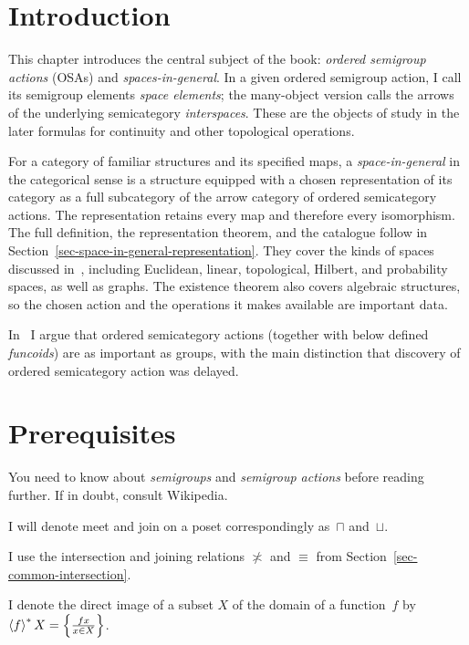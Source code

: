 \providecommand{\osaprereqref}[1]{\ref{#1}}

\chapter{Introduction}

This chapter introduces the central subject of the book: \emph{ordered
semigroup actions} (OSAs) and \emph{spaces-in-general}.  In a given ordered
semigroup action, I call its semigroup elements \emph{space elements};
the many-object version calls the arrows of the underlying semicategory
\emph{interspaces}. These are the objects of study in the later formulas
for continuity and other topological operations.

For a category of familiar structures and its specified maps, a
\emph{space-in-general} in the categorical sense is a structure equipped
with a chosen representation of its category as a full subcategory of
the arrow category of ordered semicategory actions. The representation
retains every map and therefore every isomorphism. The full definition,
the representation theorem, and the catalogue follow in
Section~\ref{sec-space-in-general-representation}. They cover the kinds
of spaces discussed in~\cite{spaces-in-math}, including Euclidean,
linear, topological, Hilbert, and probability spaces, as well as graphs.
The existence theorem also covers algebraic structures, so the chosen
action and the operations it makes available are important data.

In~\cite{important} I argue that ordered semicategory actions (together with below defined \emph{funcoids}) are as important as groups, with the main distinction that discovery of ordered semicategory action was delayed.

\chapter{Prerequisites}

You need to know about \emph{semigroups} and \emph{semigroup actions} before reading further. If in doubt, consult Wikipedia.

I will denote meet and join on a poset correspondingly as~$\sqcap$ and~$\sqcup$.

I use the intersection and joining relations $\nasymp$ and $\equiv$
from Section~\osaprereqref{sec-common-intersection}.

I denote the direct image of a subset $X$ of the domain of a function~$f$ by $\left\langle f\right\rangle ^{\ast}X = \left\{ \frac{fx}{x\in X}\right\}$.

